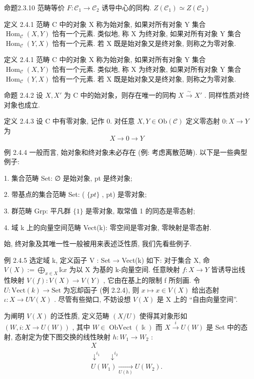 \documentclass[]{article}
\begin{document}
命题2.3.10 范畴等价 $F:\mathcal{C}_1\to \mathcal{C}_2$ 诱导中心的同构. $Z(\mathcal{C}_1)\simeq Z(\mathcal{C}_2)$ 

定义 2.4.1 范畴 C 中的对象 X 称为始对象, 如果对所有对象 Y 集合 $\operatorname{Hom}_{\mathcal{C}}(X,Y)$ 恰有一个元素. 类似地, 称 X 为终对象, 如果对所有对象 Y 集合 $\operatorname{Hom}_{\mathcal{C}}(Y,X)$ 恰有一个元素. 若 X 既是始对象又是终对象, 则称之为零对象. 

定义 2.4.1 范畴 C 中的对象 X 称为始对象, 如果对所有对象 Y 集合 $\operatorname{Hom}_{\mathcal{C}}(X,Y)$ 恰有一个元素. 类似地, 称 X 为终对象, 如果对所有对象 Y 集合 $\operatorname{Hom}_{\mathcal{C}}(Y,X)$ 恰有一个元素. 若 X 既是始对象又是终对象, 则称之为零对象. 

命题 2.4.2 设 $X, X'$ 为 C 中的始对象，则存在唯一的同构 $X \xrightarrow{\sim} X'$ . 同样性质对终对象也成立. 

定义 2.4.3 设 C 中有零对象, 记作 0. 对任意 $X, Y \in \mathrm{Ob}(\mathcal{C})$ 定义零态射 $0: X \to Y$ 为 $$
X \to 0 \to Y
$$

例 2.4.4 一般而言, 始对象和终对象未必存在 (例: 考虑离散范畴). 以下是一些典型例子: 

1. 集合范畴 Set: ∅ 是始对象, {pt} 是终对象; 

2. 带基点的集合范畴 Set: ( $\{pt\}$ , pt) 是零对象; 

3. 群范畴 Grp: 平凡群 $\{1\}$ 是零对象, 取常值 1 的同态是零态射; 

4. 域 k 上的向量空间范畴 Vect(k): 零空间是零对象, 零映射是零态射. 

始, 终对象及其唯一性一般被用来表述泛性质, 我们先看些例子. 

例 2.4.5 选定域 k, 定义函子 V : Set → Vect(k) 如下: 对于集合 X, 命 $V(X) := \bigoplus_{x \in X} \mathbb{k}x$ 为以 X 为基的 k-向量空间. 任意映射 $f : X \to Y$ 皆诱导出线性映射 $V(f) : V(X) \to V(Y)$ , 它由在基上的限制 f 所刻画. 令 $U : \text{Vect}(k) \to \text{Set}$ 为忘却函子 (例 2.2.4), 则 $x \mapsto x \in V(X)$ 给出态射 $\iota : X \to UV(X)$ . 尽管有些拗口, 不妨设想 $V(X)$ 是 X 上的 “自由向量空间”. 

为阐明 $V(X)$ 的泛性质, 定义范畴 $(X/U)$ 使得其对象形如 $(W, i: X \to U(W))$ , 其中 $W \in \operatorname{ObVect}(\Bbbk)$ 而 $X \xrightarrow{i} U(W)$ 是 Set 中的态射, 态射定为使下图交换的线性映射 $h: W_{1} \to W_{2}$ :$$
\begin{array}{c} X \\ \downarrow^ {i _ {1}} \quad \downarrow^ {i _ {2}} \\ U (W _ {1}) \xrightarrow [ U (h) ]{} U (W _ {2}). \end{array}
$$
\end{document}
